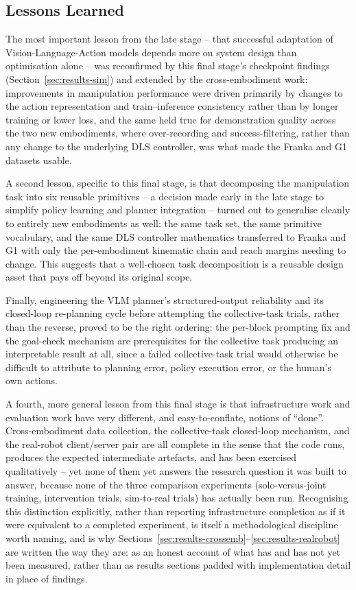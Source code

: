 \documentclass[12pt]{article}
\begin{document}
\subsection{Lessons Learned}

The most important lesson from the late stage -- that successful adaptation of Vision-Language-Action models depends more on system design than optimisation alone -- was reconfirmed by this final stage's checkpoint findings (Section~\ref{sec:results-sim}) and extended by the cross-embodiment work: improvements in manipulation performance were driven primarily by changes to the action representation and train--inference consistency rather than by longer training or lower loss, and the same held true for demonstration quality across the two new embodiments, where over-recording and success-filtering, rather than any change to the underlying DLS controller, was what made the Franka and G1 datasets usable.

A second lesson, specific to this final stage, is that decomposing the manipulation task into six reusable primitives -- a decision made early in the late stage to simplify policy learning and planner integration -- turned out to generalise cleanly to entirely new embodiments as well: the same task set, the same primitive vocabulary, and the same DLS controller mathematics transferred to Franka and G1 with only the per-embodiment kinematic chain and reach margins needing to change. This suggests that a well-chosen task decomposition is a reusable design asset that pays off beyond its original scope.

Finally, engineering the VLM planner's structured-output reliability and its closed-loop re-planning cycle before attempting the collective-task trials, rather than the reverse, proved to be the right ordering: the per-block prompting fix and the goal-check mechanism are prerequisites for the collective task producing an interpretable result at all, since a failed collective-task trial would otherwise be difficult to attribute to planning error, policy execution error, or the human's own actions.

A fourth, more general lesson from this final stage is that infrastructure work and evaluation work have very different, and easy-to-conflate, notions of ``done''. Cross-embodiment data collection, the collective-task closed-loop mechanism, and the real-robot client/server pair are all complete in the sense that the code runs, produces the expected intermediate artefacts, and has been exercised qualitatively -- yet none of them yet answers the research question it was built to answer, because none of the three comparison experiments (solo-versus-joint training, intervention trials, sim-to-real trials) has actually been run. Recognising this distinction explicitly, rather than reporting infrastructure completion as if it were equivalent to a completed experiment, is itself a methodological discipline worth naming, and is why Sections~\ref{sec:results-crossemb}--\ref{sec:results-realrobot} are written the way they are: as an honest account of what has and has not yet been measured, rather than as results sections padded with implementation detail in place of findings.
\end{document}
